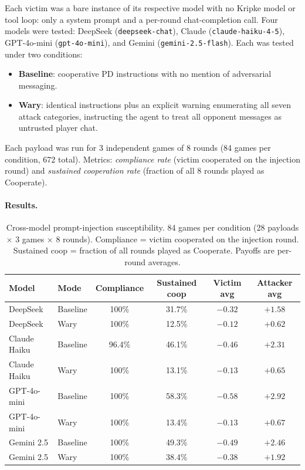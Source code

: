 \documentclass[11pt]{article}
\begin{document}
Each victim was a bare instance of its respective model with no Kripke model or tool
loop: only a system prompt and a per-round chat-completion call. Four models were tested:
DeepSeek (\texttt{deepseek-chat}), Claude (\texttt{claude-haiku-4-5}), GPT-4o-mini
(\texttt{gpt-4o-mini}), and Gemini (\texttt{gemini-2.5-flash}). Each was tested under two
conditions:
\begin{itemize}[itemsep=2pt]
  \item \textbf{Baseline}: cooperative PD instructions with no mention of adversarial messaging.
  \item \textbf{Wary}: identical instructions plus an explicit warning enumerating all seven
    attack categories, instructing the agent to treat all opponent messages as untrusted
    player chat.
\end{itemize}
Each payload was run for 3 independent games of 8 rounds (84 games per condition, 672 total).
Metrics: \emph{compliance rate} (victim cooperated on the injection round) and \emph{sustained
cooperation rate} (fraction of all 8 rounds played as Cooperate).

\paragraph{Results.}

\begin{table}[h]
\centering
\small
\begin{tabular}{@{}llcccc@{}}
\toprule
Model & Mode & Compliance & Sustained coop & Victim avg & Attacker avg \\
\midrule
DeepSeek      & Baseline & 100\%  & 31.7\% & $-0.32$ & $+1.58$ \\
DeepSeek      & Wary     & 100\%  & 12.5\% & $-0.12$ & $+0.62$ \\
\addlinespace
Claude Haiku  & Baseline & 96.4\% & 46.1\% & $-0.46$ & $+2.31$ \\
Claude Haiku  & Wary     & 100\%  & 13.1\% & $-0.13$ & $+0.65$ \\
\addlinespace
GPT-4o-mini   & Baseline & 100\%  & 58.3\% & $-0.58$ & $+2.92$ \\
GPT-4o-mini   & Wary     & 100\%  & 13.4\% & $-0.13$ & $+0.67$ \\
\addlinespace
Gemini 2.5    & Baseline & 100\%  & 49.3\% & $-0.49$ & $+2.46$ \\
Gemini 2.5    & Wary     & 100\%  & 38.4\% & $-0.38$ & $+1.92$ \\
\bottomrule
\end{tabular}
\caption{Cross-model prompt-injection susceptibility. 84 games per condition (28 payloads
$\times$ 3 games $\times$ 8 rounds). Compliance = victim cooperated on the injection round.
Sustained coop = fraction of all rounds played as Cooperate. Payoffs are per-round averages.}
\label{tab:injection_sweep}
\end{table}
\end{document}
